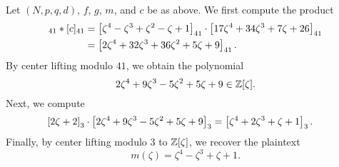 \documentclass[10pt,reqno]{article}
\begin{document}
\begin{example}\label{ex:decryption}
    Let $(N,p,q,d)$, $f$, $g$, $m$, and $c$ be as above. We first compute the product
    \begin{align*}
        [f]_{41} * [c]_{41} &= \eq{\zeta^4-\zeta^3+\zeta^2-\zeta+1}{41} \cdot \eq{17\zeta^4+34\zeta^3+7\zeta+26}{41}
        \\&=\eq{2\zeta^4 +32\zeta^3+36\zeta^2+5\zeta+9}{41}. 
    \end{align*}
By center lifting modulo $41$, we obtain the polynomial
    \[2\zeta^4+9\zeta^3-5\zeta^2+5\zeta+9 \in \mathbb{Z}[\zeta].\]
Next, we compute
    \begin{align*}
        \left[{2\zeta+2}\right]_{{3}} \cdot \left[{2\zeta^4+9\zeta^3-5\zeta^2+5\zeta+9}\right]_{{3}} &=\left[{\zeta^4+2\zeta^3+\zeta+1}\right]_{{3}}.
    \end{align*}
    Finally, by center lifting modulo $3$ to $\mathbb{Z}[\zeta]$, we recover the plaintext
    \[m(\zeta)=\zeta^4-\zeta^3+\zeta+1.\]
\end{example}

\begin{comment}
\begin{proposition}\label{prop:insecure}
    If $p \mid q$, then Tyrell can easily decrypt the message without knowledge of $k_{\sf{priv}}$. 
\end{proposition}
\begin{proof}
    Recall that $(N,p,q,d)$ is public. Suppose $p \mid q$. Then 
    \begin{align*}
        E_{k_{\sf{pub}}}(m)&=\eq{p}{q}\cdot \eq{f}{q}^{-1} \cdot \eq{g}{q}\cdot \eq{r}{q}+ \eq{m}{q}
        =\eq{m}{q}.
    \end{align*}
    Now write $\eq{m}{q}=\sum\eq{\alpha_i}{q}\zeta^i$. Then for some $c_i \in \Z$,
    \begin{align*}
        \eq{m}{q}&=\sum_{i=0}^{N-1} (c_i q+\alpha_i)\zeta^i=\sum_{i=0}^{N-1}(c_i q)\zeta^i + \sum_{i=0}^{N-1} \alpha_i \zeta^i.
    \end{align*}
    But since $p \mid q$, we know $q = p \ell$ for some $\ell \in \Z$ and $\eq{p}{p}=\eq{0}{p}$. Hence
        \begin{align*}
            \eq{\eq{m}{q}}{p} = \sum_{i=0}^{N-1} \eq{\Z(p\ell)}{p}\zeta^i + \sum_{i=0}^{N-1} \eq{\alpha_i}{p}\zeta^i = \sum_{i=0}^{N-1} \eq{\alpha_i}{p}\zeta^i =\eq{m}{p}.
        \end{align*}
        Now center lifting modulo $p$ to $\Z[\zeta]$ gives the plaintext $m\in \Z[\zeta]$. 
\end{proof}


\begin{remark*}
    The above result justifies the requirement that $\gcd(p,q)=1$.
\end{remark*}
\end{comment}
\end{document}
